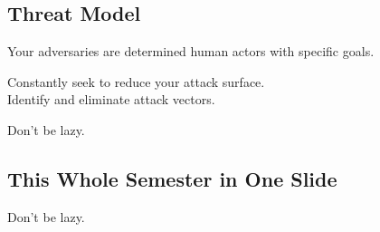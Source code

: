 \documentclass[xga]{xdvislides}
\begin{document}
\subsection{Threat Model}
\vspace*{\fill}
\Huge
\begin{center}
Your adversaries are determined human actors with
specific goals. \\
\addvspace{.5in}

Constantly seek to reduce your attack surface. \\
Identify and eliminate attack vectors.\\
\addvspace{.5in}

Don't be lazy.
\end{center}
\Normalsize
\vspace*{\fill}

\subsection{This Whole Semester in One Slide}
\vspace*{\fill}
\Huge
\begin{center}
Don't be lazy.
\end{center}
\Normalsize
\vspace*{\fill}
\end{document}
